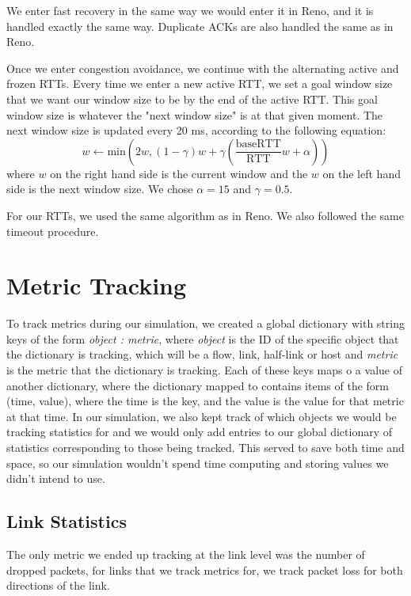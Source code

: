 \documentclass{article}
\begin{document}
We enter fast recovery in the same way we would enter it in Reno, and it is handled exactly the same way. Duplicate ACKs are also handled the same as in Reno.

Once we enter congestion avoidance, we continue with the alternating active and frozen RTTs. Every time we enter a new active RTT, we set a goal window size that we want our window size to be by the end of the active RTT. This goal window size is whatever the "next window size" is at that given moment. The next window size is updated every 20 ms, according to the following equation: $$ w \leftarrow \textrm{min}(2w, (1-\gamma)w + \gamma(\frac{\textrm{baseRTT}}{\textrm{RTT}}w + \alpha)) $$
where $w$ on the right hand side is the current window and the $w$ on the left hand side is the next window size. We chose $\alpha = 15$ and $\gamma = 0.5$. 

For our RTTs, we used the same algorithm as in Reno. We also followed the same timeout procedure.


\section{Metric Tracking}

To track metrics during our simulation, we created a global dictionary with string keys of the form {\em object : metric}, where {\em object} is the ID of the specific object that the dictionary is tracking, which will be a flow, link, half-link or host and {\em metric} is the metric that the dictionary is tracking. Each of these keys maps o a value of another dictionary, where the dictionary mapped to contains items of the form (time, value), where the time is the key, and the value is the value for that metric at that time. In our simulation, we also kept track of which objects we would be tracking statistics for and we would only add entries to our global dictionary of statistics corresponding to those being tracked. This served to save both time and space, so our simulation wouldn't spend time computing and storing values we didn't intend to use. 

\subsection{Link Statistics}
The only metric we ended up tracking at the link level was the number of dropped packets, for links that we track metrics for, we track packet loss for both directions of the link.
\end{document}
